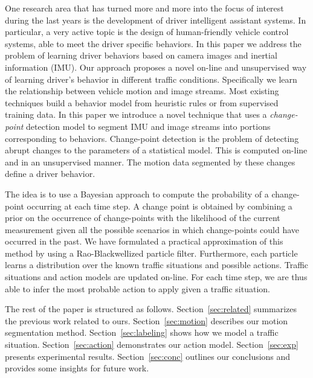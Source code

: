 One research area that has turned more and more into the focus of interest
during the last years is the development of driver intelligent assistant
systems. In particular, a very active topic is the design of human-friendly
vehicle control systems, able to meet the driver specific behaviors.
In this paper we address the problem of learning driver behaviors based on
camera images and inertial information (IMU). Our approach proposes a novel
on-line and unsupervised way of learning driver's behavior in different traffic
conditions. Specifically we learn the relationship between vehicle motion and
image streams. Most existing techniques build a behavior model from heuristic
rules or from supervised training data. In this paper we introduce a novel
technique that uses a \textit{change-point} detection model to segment IMU and
image streams into portions corresponding to behaviors. Change-point detection
is the problem of detecting abrupt changes to the parameters of a statistical
model. This is computed on-line and in an unsupervised manner. The motion data
segmented by these changes define a driver behavior.

The idea is to use a Bayesian approach to compute the probability of a
change-point occurring at each time step. A change point is obtained by
combining a prior on the occurrence of change-points with the likelihood of the
current measurement given all the possible scenarios in which change-points
could have occurred in the past. We have formulated a
practical approximation of this method by using a Rao-Blackwellized particle
filter. Furthermore, each particle learns a distribution over the known traffic
situations and possible actions. Traffic situations and action models are
updated on-line. For each time step, we are thus able to infer the most probable
action to apply given a traffic situation.

The rest of the paper is structured as follows. Section~\ref{sec:related}
summarizes the previous work related to ours. Section~\ref{sec:motion}
describes our motion segmentation method. Section~\ref{sec:labeling}
shows how we model a traffic situation. Section~\ref{sec:action} demonstrates
our action model. Section~\ref{sec:exp} presents experimental results.
Section~\ref{sec:conc} outlines our conclusions and provides some insights for
future work.
